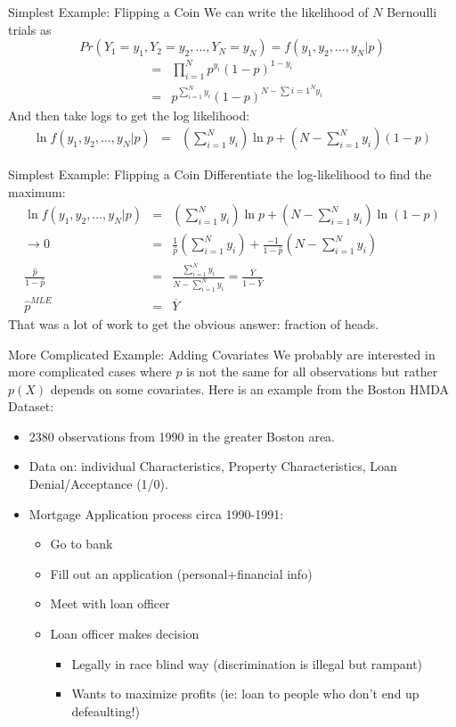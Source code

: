 \begin{frame}{Simplest Example: Flipping a Coin}
We can write the likelihood of $N$ Bernoulli trials as 
$$Pr(Y_1 = y_1, Y_2=y_2,\ldots,Y _N=y_N )  =  f(y_1,y_2,\ldots,y_N | p ) $$
\begin{eqnarray*}
&=& \prod_{i=1}^N p^{y_i} (1-p)^{1-y_i}\\
&=& p^{\sum_{i=1}^N y_i} (1-p)^{N-\sum{i=1}^N y_i}
\end{eqnarray*}
And then take logs to get the \alert{log likelihood}:
\begin{eqnarray*}
\ln  f(y_1,y_2,\ldots,y_N | p )  &=& \left( \sum_{i=1}^N y_i \right)  \ln p  + \left(N-\sum_{i=1}^N y_i \right)  (1-p)
\end{eqnarray*}
\end{frame}

\begin{frame}{Simplest Example: Flipping a Coin}
Differentiate the log-likelihood to find the maximum:
\begin{eqnarray*}
\ln  f(y_1,y_2,\ldots,y_N | p )  &=& \left( \sum_{i=1}^N y_i \right)  \ln p  + \left(N-\sum_{i=1}^N y_i \right)  \ln(1-p)\\
\rightarrow 0&=& \frac{1}{\hat{p}}  \left( \sum_{i=1}^N y_i \right) + \frac{-1}{1-\hat{p}}   \left(N-\sum_{i=1}^N y_i \right) \\
 \frac{\hat{p}}{1-\hat{p}} &=& \frac{\sum_{i=1}^N y_i }{N- \sum_{i=1}^N y_i } = \frac{\overline{Y}}{1-\overline{Y}} \\
\hat{p}^{MLE} &=& \overline{Y}
\end{eqnarray*}
That was a lot of work to get the obvious answer: \alert{fraction of heads}.
\end{frame}

\begin{frame}{More Complicated Example: Adding Covariates}
We probably are interested in more complicated cases where $p$ is not the same for all observations but rather $p(X)$ depends on some covariates. Here is an example from the Boston HMDA Dataset:
\begin{itemize}
\item 2380 observations from 1990 in the greater Boston area.
\item Data on: individual Characteristics, Property Characteristics, Loan Denial/Acceptance (1/0).
\item Mortgage Application process circa 1990-1991:
\begin{itemize}
\item Go to bank
\item Fill out an application (personal+financial info)
\item Meet with loan officer
\item Loan officer makes decision
\begin{itemize}
\item Legally in race blind way (discrimination is illegal but rampant)
\item Wants to maximize profits (ie: loan to people who don't end up defeaulting!)
\end{itemize}
\end{itemize}
\end{itemize}
\end{frame}


